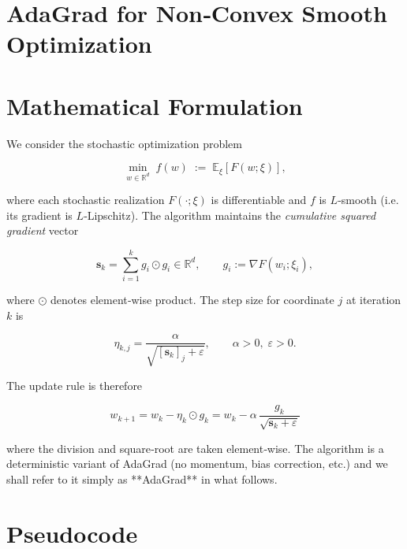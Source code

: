 \documentclass{article}
\begin{document}
\section*{AdaGrad for Non‑Convex Smooth Optimization}

\section*{Mathematical Formulation}

We consider the stochastic optimization problem  

\[
\min_{w\in\mathbb{R}^{d}} \; f(w) \;:=\; \mathbb{E}_{\xi}[F(w;\xi)],
\]

where each stochastic realization $F(\cdot;\xi)$ is differentiable and $f$ is $L$‑smooth (i.e. its gradient is $L$‑Lipschitz).  
The algorithm maintains the \emph{cumulative squared gradient} vector  

\[
\mathbf{s}_{k}= \sum_{i=1}^{k} g_i\odot g_i\in\mathbb{R}^{d},
\qquad 
g_i:=\nabla F(w_i;\xi_i),
\]

where $\odot$ denotes element‑wise product.  
The step size for coordinate $j$ at iteration $k$ is  

\[
\eta_{k,j}= \frac{\alpha}{\sqrt{[\mathbf{s}_{k}]_j+\varepsilon}},\qquad
\alpha>0,\;\varepsilon>0.
\]

The update rule is therefore  

\[
\boxed{
w_{k+1}= w_{k}-\eta_{k}\odot g_{k}
      = w_{k} - \alpha\,\frac{g_{k}}{\sqrt{\mathbf{s}_{k}+\varepsilon}} }    \tag{1}
\]

where the division and square‑root are taken element‑wise.  The algorithm is a deterministic variant of AdaGrad (no momentum, bias correction, etc.) and we shall refer to it simply as **AdaGrad** in what follows.

\section*{Pseudocode}
\end{document}
